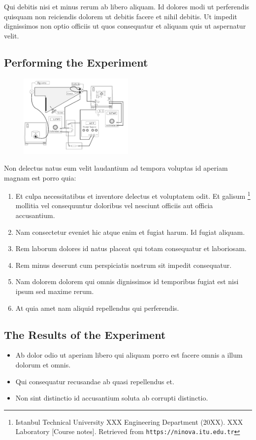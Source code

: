 \documentclass[10pt]{article}
\begin{document}
Qui debitis nisi et minus rerum ab libero aliquam. Id dolores modi ut perferendis quisquam non reiciendis dolorem ut debitis facere et nihil debitis. Ut impedit dignissimos non optio officiis ut quos consequatur et aliquam quis ut aspernatur velit. 

\subsection*{Performing the Experiment}
\begin{figure} %
    \raggedleft
    \vspace{0.5cm}
    \includegraphics[width=0.5\textwidth]{figures/experimental_setup.png}
    \vspace{-2cm}
\end{figure}

Non delectus natus eum velit laudantium ad tempora voluptas id aperiam magnam est porro quia: 

\begin{enumerate}
\item Et culpa necessitatibus et inventore delectus et voluptatem odit. Et galisum \footnote{Istanbul Technical University XXX Engineering Department (20XX). XXX Laboratory [Course notes]. Retrieved from \texttt{https://ninova.itu.edu.tr}} mollitia vel consequuntur doloribus vel nesciunt officiis aut officia accusantium.

\item Nam consectetur eveniet hic atque enim et fugiat harum. Id fugiat aliquam.
\item Rem laborum dolores id natus placeat qui totam consequatur et laboriosam.
\item Rem minus deserunt cum perspiciatis nostrum sit impedit consequatur.
\item Nam dolorem dolorem qui omnis dignissimos id temporibus fugiat est nisi ipsum sed maxime rerum.
\item At quia amet nam aliquid repellendus qui perferendis.
\end{enumerate}
\subsection*{The Results of the Experiment }
\begin{itemize}
\item Ab dolor odio ut aperiam libero qui aliquam porro est facere omnis a illum dolorum et omnis. 
\item Qui consequatur recusandae ab quasi repellendus et.
\item Non sint distinctio id accusantium soluta ab corrupti distinctio.
\end{itemize}
\end{document}

